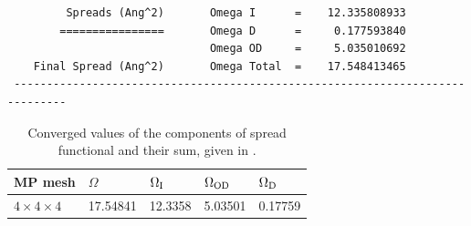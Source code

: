 \begin{itemize}
\begin{tcolorbox}[sharp corners,boxrule=0.5pt]
{\begin{verbatim}
         Spreads (Ang^2)       Omega I      =    12.335808933
        ================       Omega D      =     0.177593840
                               Omega OD     =     5.035010692
    Final Spread (Ang^2)       Omega Total  =    17.548413465
 ------------------------------------------------------------------------------
 	\end{verbatim}
 	}

	\end{tcolorbox}


	\begin{table}[t!]
	\centering
	\caption{Converged values of the components of spread functional and their sum, given in \angsqd{}.}
	\begin{tabular}{@{} lllll @{}}\toprule[1.5pt]
	MP mesh & $\Omega$ & $\Omega\tinysub{I}$ & $\Omega\tinysub{OD}$ & $\Omega\tinysub{D}$ \\\midrule
	$4\times4\times4$ & 17.54841 &  12.3358 & 5.03501 & 0.17759 \\\bottomrule
	\end{tabular}\label{tab11.2}
	\end{table}


\end{itemize}
